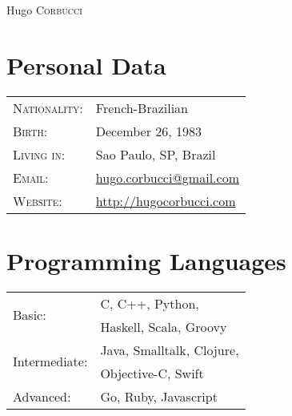 \documentclass[letter,10pt]{article}
\begin{document}
\par{\centering
		{\Huge Hugo \textsc{Corbucci}
	}\bigskip\par}

\begin{multicols}{2}
\section{Personal Data}

\begin{tabular}{p{2.5cm}l}
  \textsc{Nationality:} & French-Brazilian\\
  \textsc{Birth:} & December 26, 1983\\
  \textsc{Living in:}   & Sao Paulo, SP, Brazil\\
  \textsc{Email:}     &
  \href{mailto:hugo.corbucci@gmail.com}{hugo.corbucci@gmail.com}\\
  \textsc{Website:}     & \href{http://hugocorbucci.com}{http://hugocorbucci.com}
\end{tabular}

\section{Programming Languages}
\begin{tabular}[t]{p{2.5cm}l}
  \multirow[t]{2}{*}{Basic:} & C, C++, Python,\\
 & Haskell, Scala, Groovy\\
  \multirow[t]{2}{*}{Intermediate:} & Java, Smalltalk, Clojure,\\
 & Objective-C, Swift\\
 Advanced:& Go, Ruby, Javascript\\
\end{tabular}
\end{multicols}
\end{document}
